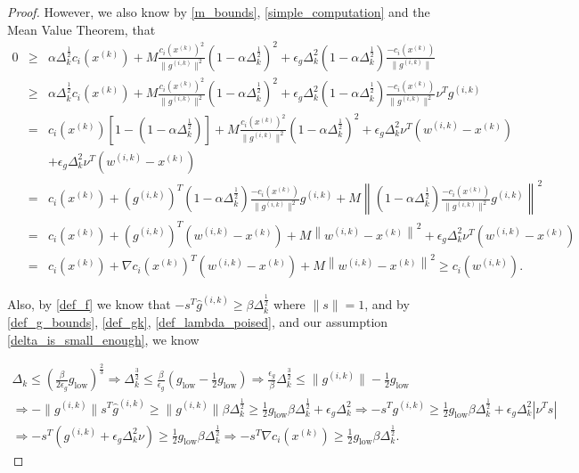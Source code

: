 \documentclass{article}
\theoremstyle{case}
\newcommand{\dk}{\Delta_k}
\newcommand{\xk}{{x^{(k)}}}
\newcommand{\gik}{{g^{(i, k)}}}
\newcommand{\hgik}{{{\hat g}^{(i, k)}}}
\newcommand{\wik}{{w^{(i, k)}}}
\begin{document}
\begin{proof}
However, we also know by \cref{m_bounds}, \cref{simple_computation} and the Mean Value Theorem, that
\begin{align*}
0 &\ge& \alpha \dk^{\frac 1 2 } c_i(\xk) + M \frac {c_i(\xk)^2}{\|\gik\|^2}\left(1 - \alpha \dk^{\frac 1 2 }\right)^2 + \epsilon_g \dk^2 \left(1 - \alpha \dk^{\frac 1 2 }\right)\frac{-c_i(\xk)}{\|\gik\|} & \\
&\ge& \alpha \dk^{\frac 1 2 } c_i(\xk) + M \frac {c_i(\xk)^2}{\|\gik\|^2}\left(1 - \alpha \dk^{\frac 1 2 }\right)^2 + \epsilon_g \dk^2 \left(1 - \alpha \dk^{\frac 1 2 }\right)\frac{-c_i(\xk)}{\|\gik\|^2}\nu^T\gik & \\
&=& c_i(\xk)\left[1 - \left(1 - \alpha \dk^{\frac 1 2 }\right)\right] + M \frac {c_i(\xk)^2}{\|\gik\|^2}\left(1 - \alpha \dk^{\frac 1 2 }\right)^2 + \epsilon_g \dk^2\nu^T \left(\wik - \xk\right) & \\
&& + \epsilon_g \dk^2\nu^T \left(\wik - \xk\right) & \\
&=& c_i(\xk) + \left(\gik\right)^T\left(1 - \alpha \dk^{\frac 1 2 }\right)\frac{-c_i(\xk)}{\|\gik\|^2}\gik + M \left\|\left(1 - \alpha \dk^{\frac 1 2 }\right)\frac{-c_i(\xk)}{\|\gik\|^2}\gik\right\|^2 & \\
&=& c_i(\xk) + \left(\gik\right)^T\left(\wik - \xk\right)+ M \left\|\wik - \xk\right\|^2  + \epsilon_g \dk^2\nu^T \left(\wik - \xk\right) & \\
 & = & c_i(\xk) + \nabla c_i(\xk)^T\left(\wik - \xk \right) + M \left\|\wik - \xk\right\|^2 \ge c_i(\wik). &
\end{align*}


Also, by \cref{def_f} we know that $-s^T \hgik \ge \beta \dk^{\frac 1 2}$ where $\|s\| = 1$, and by \cref{def_g_bounds}, \cref{def_gk}, \cref{def_lambda_poised}, and our assumption \cref{delta_is_small_enough}, we know

\begin{align}
\dk \le \left(\frac{\beta}{2\epsilon_{g}}g_{\text{low}}\right)^{\frac 2 3} 
\Longrightarrow \dk^{\frac 3 2} \le \frac{\beta}{\epsilon_{g}}\left(g_{\text{low}} - \frac 1 2 g_{\text{low}}\right)
\Longrightarrow \frac{\epsilon_{g}}{\beta} \dk^{\frac 3 2} \le \|\gik\| - \frac 1 2 g_{\text{low}} \nonumber \\
\Longrightarrow -\|\gik\|s^T\hgik \ge \|\gik\|\beta\dk^{\frac 1 2} \ge \frac 1 2 g_{\text{low}} \beta \dk^{\frac 1 2} + \epsilon_{g}\dk^2 
\Longrightarrow -s^T\gik \ge \frac 1 2 g_{\text{low}} \beta \dk^{\frac 1 2} + \epsilon_{g}\dk^2|\nu^T s| \nonumber \\ 
\Longrightarrow -s^T\left(\gik + \epsilon_{g}\dk^2\nu\right) \ge \frac 1 2 g_{\text{low}} \beta \dk^{\frac 1 2} 
\Longrightarrow -s^T\nabla c_i(\xk) \ge \frac 1 2 g_{\text{low}} \beta \dk^{\frac 1 2}. \label{nsc_pos}
\end{align}


\end{proof}
\end{document}
